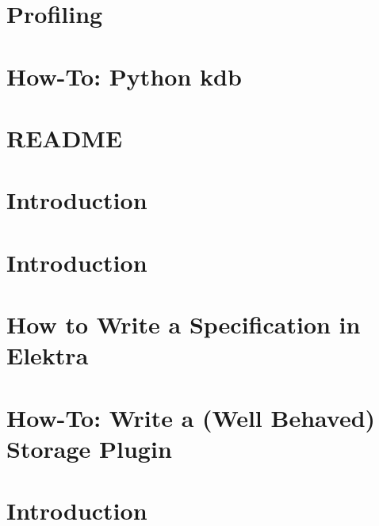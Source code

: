 \let\mypdfximage\pdfximage\def\pdfximage{\immediate\mypdfximage}\documentclass[twoside]{book}
\newcommand{\+}{\discretionary{\mbox{\scriptsize$\hookleftarrow$}}{}{}}
\begin{document}
\chapter{Profiling}
\label{doc_tutorials_profiling_md}

\chapter{How-\/\+To\+: Python kdb}
\label{doc_tutorials_python-kdb_md}

\chapter{README}
\label{md_doc_tutorials_README}

\chapter{Introduction}
\label{doc_tutorials_run_all_tests_with_docker_md}

\chapter{Introduction}
\label{doc_tutorials_run_reformatting_script_with_docker_md}

\chapter{How to Write a Specification in Elektra}
\label{doc_tutorials_specification_md}

\chapter{How-\/\+To\+: Write a (Well Behaved) Storage Plugin}
\label{doc_tutorials_storage-plugins_md}

\chapter{Introduction}
\label{doc_tutorials_using_podman_instead_of_docker_md}

\end{document}
